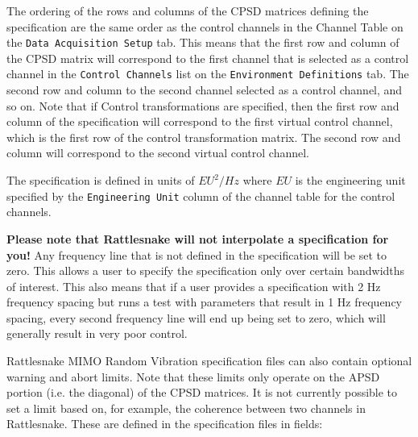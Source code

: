 \documentclass[pdf,12pt,report]{SANDreport}
\newcommand{\inlineCode}{\lstinline[basicstyle=\bfseries\ttfamily]}
\begin{document}
    The ordering of the rows and columns of the \ac{CPSD} matrices defining the specification are the same order as the control channels in the Channel Table on the \inlineCode{Data Acquisition Setup} tab.  This means that the first row and column of the \ac{CPSD} matrix will correspond to the first channel that is selected as a control channel in the \inlineCode{Control Channels} list on the \inlineCode{Environment Definitions} tab.  The second row and column to the second channel selected as a control channel, and so on.  Note that if Control transformations are specified, then the first row and column of the specification will correspond to the first virtual control channel, which is the first row of the control transformation matrix.  The second row and column will correspond to the second virtual control channel.
    
    The specification is defined in units of $EU^2/Hz$ where $EU$ is the engineering unit specified by the \inlineCode{Engineering Unit} column of the channel table for the control channels.
    
    \textbf{Please note that Rattlesnake will not interpolate a specification for you!}  Any frequency line that is not defined in the specification will be set to zero.  This allows a user to specify the specification only over certain bandwidths of interest.  This also means that if a user provides a specification with 2 Hz frequency spacing but runs a test with parameters that result in 1 Hz frequency spacing, every second frequency line will end up being set to zero, which will generally result in very poor control.
    
    Rattlesnake \Ac{MIMO} Random Vibration specification files can also contain optional warning and abort limits.  Note that these limits only operate on the \Ac{APSD} portion (i.e. the diagonal) of the \Ac{CPSD} matrices.  It is not currently possible to set a limit based on, for example, the coherence between two channels in Rattlesnake.  These are defined in the specification files in fields:
    
\end{document}

